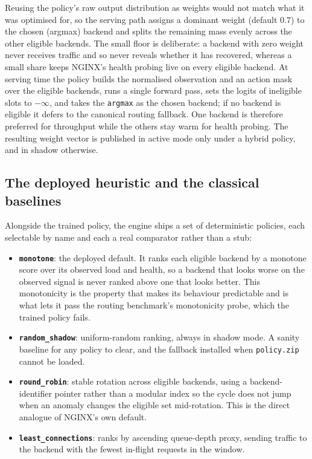 Reusing the policy's raw output distribution as weights would not match what it
was optimised for, so the serving path assigns a dominant weight (default $0.7$) to
the chosen (argmax) backend and splits the remaining mass evenly across the other
eligible backends. The small floor is deliberate: a backend with zero weight never
receives traffic and so never reveals whether it has recovered, whereas a small
share keeps NGINX's health probing live on every eligible backend. At serving time
the policy builds the normalised observation and an action mask over the eligible
backends, runs a single forward pass, sets the logits of ineligible slots to
$-\infty$, and takes the \texttt{argmax} as the chosen backend; if no backend is
eligible it defers to the canonical routing fallback. One backend is therefore
preferred for throughput while the others stay warm for health probing. The
resulting weight vector is published in active mode only under a hybrid policy, and
in shadow otherwise.

\subsection{The deployed heuristic and the classical baselines}\label{imb:ppo_baselines}

Alongside the trained policy, the engine ships a set of deterministic policies,
each selectable by name and each a real comparator rather than a stub:

\begin{itemize}
  \item \textbf{\texttt{monotone}}: the deployed default. It ranks each eligible
        backend by a monotone score over its observed load and health, so a
        backend that looks worse on the observed signal is never ranked above one
        that looks better. This monotonicity is the property that makes its
        behaviour predictable and is what lets it pass the routing benchmark's
        monotonicity probe, which the trained policy fails.
  \item \textbf{\texttt{random\_shadow}}: uniform-random ranking, always in
        shadow mode. A sanity baseline for any policy to clear, and the
        fallback installed when \texttt{policy.zip} cannot be loaded.
  \item \textbf{\texttt{round\_robin}}: stable rotation across eligible
        backends, using a backend-identifier pointer rather than a modular index
        so the cycle does not jump when an anomaly changes the eligible set
        mid-rotation. This is the direct analogue of NGINX's own default.
  \item \textbf{\texttt{least\_connections}}: ranks by ascending queue-depth
        proxy, sending traffic to the backend with the fewest in-flight requests
        in the window.
\end{itemize}

